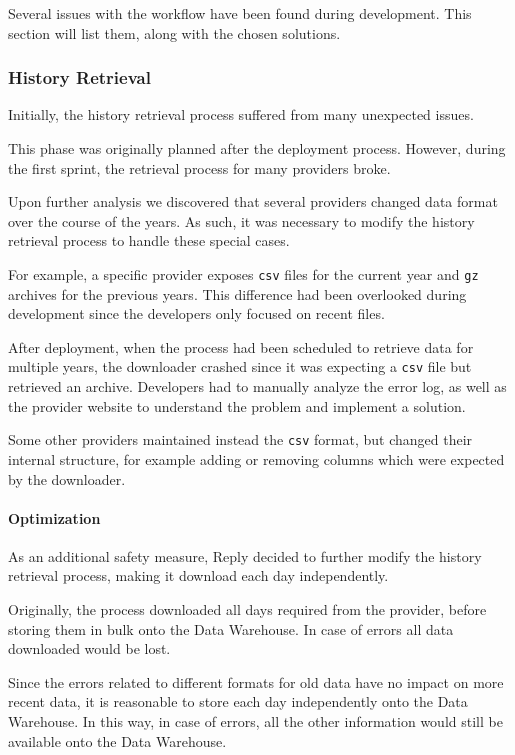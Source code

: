 Several issues with the workflow have been found during development.
This section will list them, along with the chosen solutions.

\subsubsection{History Retrieval}
    Initially, the history retrieval process suffered from many unexpected issues.
    
    This phase was originally planned after the deployment process.
    However, during the first sprint, the retrieval process for many providers broke.
    
    Upon further analysis we discovered that several providers changed data format over the course of the years.
    As such, it was necessary to modify the history retrieval process to handle these special cases.
    
    For example, a specific provider exposes \texttt{csv} files for the current year and \texttt{gz} archives for the previous years.
    This difference had been overlooked during development since the developers only focused on recent files.
    
    After deployment, when the process had been scheduled to retrieve data for multiple years, the downloader crashed since it was expecting a \texttt{csv} file but retrieved an archive.
    Developers had to manually analyze the error log, as well as the provider website to understand the problem and implement a solution.
    
    Some other providers maintained instead the \texttt{csv} format, but changed their internal structure, for example adding or removing columns which were expected by the downloader.
    
    \paragraph{Optimization}
        As an additional safety measure, Reply decided to further modify the history retrieval process, making it download each day independently.
        
        Originally, the process downloaded all days required from the provider, before storing them in bulk onto the Data Warehouse.
        In case of errors all data downloaded would be lost.
        
        Since the errors related to different formats for old data have no impact on more recent data, it is reasonable to store each day independently onto the Data Warehouse.
        In this way, in case of errors, all the other information would still be available onto the Data Warehouse.
        
